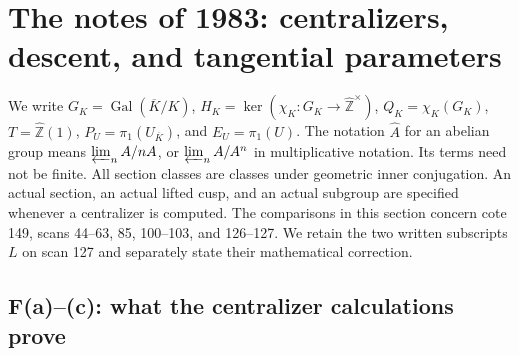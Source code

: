 \section{The notes of 1983: centralizers, descent, and tangential parameters}
\label{sec:F}

We write $G_K=\operatorname{Gal}(\overline K/K)$,
$H_K=\ker(\chi_K:G_K\to\widehat{\mathbb Z}^{\times})$,
$Q_K=\chi_K(G_K)$, $T=\widehat{\mathbb Z}(1)$,
$P_U=\pi_1(U_{\overline K})$, and $E_U=\pi_1(U)$.
The notation $\widehat{A}$ for an abelian group means
$\varprojlim_n A/nA$, or $\varprojlim_n A/A^n$ in multiplicative
notation. Its terms need not be finite. All section classes are
classes under geometric inner conjugation. An actual section, an
actual lifted cusp, and an actual subgroup are specified whenever a
centralizer is computed. The comparisons in this section concern cote
149, scans 44--63, 85, 100--103, and 126--127. We retain the two written
subscripts $L$ on scan 127 and separately state their mathematical
correction.

\subsection{F(a)--(c): what the centralizer calculations prove}

